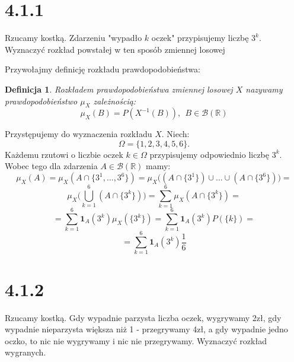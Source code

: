 \documentclass{article}
\newtheorem*{definition}{Definicja}
\begin{document}
\section*{4.1.1}
\begin{center}
    Rzucamy kostką. Zdarzeniu "wypadło \(k\) oczek" przypisujemy liczbę \(3^k\). Wyznaczyć rozkład powstałej w ten sposób
    zmiennej losowej
\end{center}

Przywołajmy definicję rozkładu prawdopodobieństwa:
\begin{definition}
Rozkładem prawdopodobieństwa zmiennej losowej \(X\) nazywamy prawdopodobieństwo \(\mu_{X}\) zależnością:
\begin{equation*}
        \mu_{X}(B) = P(X^{-1}(B)), \ \ B \in \mathcal{B}(\mathbb{R})
\end{equation*}
\end{definition}
\noindent
Przystępujemy do wyznaczenia rozkładu \(X\). Niech: 
\begin{equation*}
    \Omega = \{1, 2, 3, 4, 5, 6\}.
\end{equation*}
Każdemu rzutowi o liczbie oczek \(k \in \Omega\) przypisujemy odpowiednio liczbę \(3^k\). Wobec tego dla
zdarzenia \(A \in \mathcal{B}(\mathbb{R})\) mamy:
\begin{equation*}
    \mu_{X}(A) = \mu_{X}(A \cap \{3^1, \dots, 3^6\}) = \mu_{X}\Big((A \cap \{3^1\}) \cup \dots \cup (A \cap \{3^6\})\Big) =
\end{equation*}
\begin{equation*}
    \mu_{X}\Biggr(\bigcup_{k=1}^{6}(A \cap \{3^k\})\Biggr) = \sum_{k=1}^{6} \mu_{X}(A \cap \{3^k\}) = 
\end{equation*}
\begin{equation*}
    = \sum_{k=1}^{6} \mathbf{1}_{A}(3^k) \mu_{X}(\{3^k\}) = \sum_{k=1}^{6} \mathbf{1}_{A}(3^k) P(\{k\}) = 
\end{equation*}
\begin{equation*}
    = \sum_{k=1}^{6} \mathbf{1}_{A}(3^k) \frac{1}{6}
\end{equation*}

\section*{4.1.2}

\begin{center}
    Rzucamy kostką. Gdy wypadnie parzysta liczba oczek, wygrywamy 2zł, gdy wypadnie nieparzysta
    większa niż 1 - przegrywamy 4zł, a gdy wypadnie jedno oczko, to nic nie wygrywamy i nic nie
    przegrywamy. Wyznaczyć rozkład wygranych.
\end{center}
\end{document}
